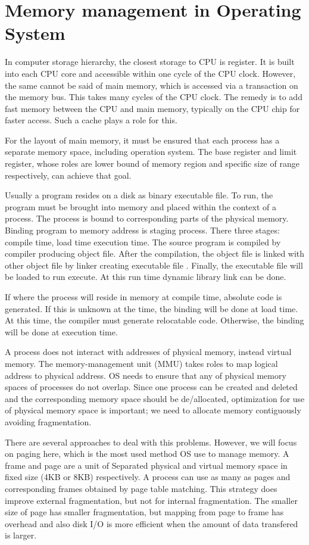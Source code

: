 \section{Memory management in Operating System}
\label{sec:history}
In computer storage hierarchy, the closest storage to CPU is register. It is built into each CPU core and accessible within one cycle of the CPU clock.
However, the same cannot be said of main memory, which is accessed via a transaction on the memory bus. This takes many cycles of the CPU clock.
The remedy is to add fast memory between the CPU and main memory, typically on the CPU chip for faster access. Such a cache plays a role for this.

For the layout of main memory, it must be ensured that each process has a separate memory space, including operation system. 
The base register and limit register, whose roles are lower bound of memory region and specific size of range respectively, can achieve that goal. 

Usually a program resides on a disk as binary executable file. To run, the program must be brought into memory and placed within the context of a process.
The process is bound to corresponding parts of the physical memory. Binding program to memory address is staging process. 
There three stages: compile time, load time execution time. The source program is compiled by compiler producing object file. 
After the compilation, the object file is linked with other object file by linker creating executable file . 
Finally, the executable file will be loaded to run execute. At this run time dynamic library link can be done.

If where the process will reside in memory at compile time, absolute code is generated. If this is unknown at the time, 
the binding will be done at load time. At this time, the compiler must generate relocatable code. Otherwise, the binding will be done at 
execution time.

A process does not interact with addresses of physical memory, instead virtual memory. The memory-management unit (MMU) takes roles to map 
logical address to physical address. OS needs to ensure that any of physical memory spaces of processes do not overlap. 
Since one process can be created and deleted and the corresponding memory space should be de/allocated, 
optimization for use of physical memory space is important; we need to allocate memory contiguously avoiding fragmentation.

There are several approaches to deal with this problems. However, we will focus on paging here, which is the most used method OS use to manage memory.
A frame and page are a unit of Separated physical and virtual memory space in fixed size (4KB or 8KB) respectively.
A process can use as many as pages and corresponding frames obtained by page table matching. This strategy does improve external fragmentation, but not for internal fragmentation.
The smaller size of page has smaller fragmentation, but mapping from page to frame has overhead and also disk I/O is more efficient when the amount of data transfered is larger.



